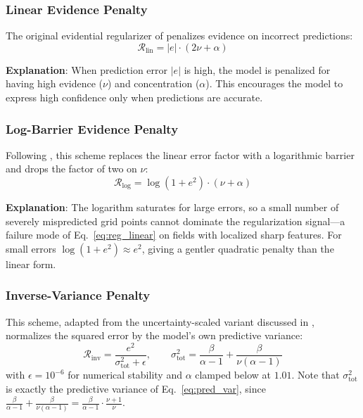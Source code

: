 \subsubsection{Linear Evidence Penalty}

The original evidential regularizer of \cite{amini2020deep} penalizes evidence on incorrect predictions:
\begin{equation}
    \mathcal{R}_{\text{lin}} = |e| \cdot (2\nu + \alpha)
    \label{eq:reg_linear}
\end{equation}

\textbf{Explanation}: When prediction error $|e|$ is high, the model is penalized for having high evidence ($\nu$) and concentration ($\alpha$). This encourages the model to express high confidence only when predictions are accurate.

\subsubsection{Log-Barrier Evidence Penalty}

Following \cite{meinert2021multivariate}, this scheme replaces the linear error factor with a logarithmic
barrier and drops the factor of two on $\nu$:
\begin{equation}
    \mathcal{R}_{\text{log}} = \log\!\left(1 + e^2\right) \cdot (\nu + \alpha)
    \label{eq:reg_logbarrier}
\end{equation}

\textbf{Explanation}: The logarithm saturates for large errors, so a small number of severely mispredicted grid
points cannot dominate the regularization signal---a failure mode of Eq.~\eqref{eq:reg_linear} on fields with
localized sharp features. For small errors $\log(1 + e^2) \approx e^2$, giving a gentler quadratic penalty than
the linear form.

\subsubsection{Inverse-Variance Penalty}

This scheme, adapted from the uncertainty-scaled variant discussed in \cite{amini2020deep}, normalizes the
squared error by the model's own predictive variance:
\begin{equation}
    \mathcal{R}_{\text{inv}} = \frac{e^2}{\sigma^2_{\text{tot}} + \epsilon},
    \qquad
    \sigma^2_{\text{tot}} = \frac{\beta}{\alpha - 1} + \frac{\beta}{\nu(\alpha - 1)}
    \label{eq:reg_invvar}
\end{equation}
with $\epsilon = 10^{-6}$ for numerical stability and $\alpha$ clamped below at $1.01$. Note that
$\sigma^2_{\text{tot}}$ is exactly the predictive variance of Eq.~\eqref{eq:pred_var}, since
$\frac{\beta}{\alpha-1} + \frac{\beta}{\nu(\alpha-1)} = \frac{\beta}{\alpha-1}\cdot\frac{\nu+1}{\nu}$.

